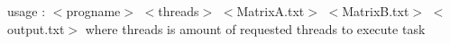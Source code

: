 usage \+: {\ttfamily \texorpdfstring{$<$}{<}progname\texorpdfstring{$>$}{>} \texorpdfstring{$<$}{<}threads\texorpdfstring{$>$}{>} \texorpdfstring{$<$}{<}Matrix\+A.\+txt\texorpdfstring{$>$}{>} \texorpdfstring{$<$}{<}Matrix\+B.\+txt\texorpdfstring{$>$}{>} \texorpdfstring{$<$}{<}output.\+txt\texorpdfstring{$>$}{>}} where \textquotesingle{}threads\textquotesingle{} is amount of requested threads to execute task 